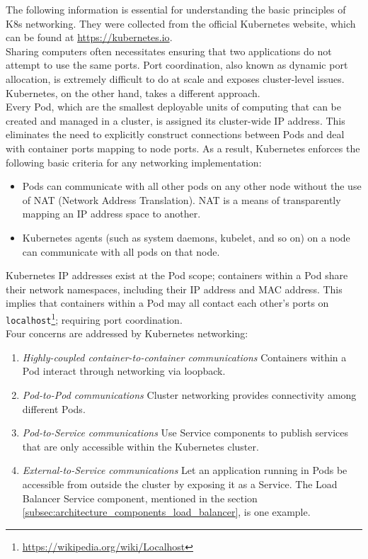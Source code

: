 The following information is essential for understanding the basic principles of
K8s networking. They were collected from the official Kubernetes website, which
can be found at \url{https://kubernetes.io}. \\ %
Sharing computers often necessitates ensuring that two applications do not
attempt to use the same ports. Port coordination, also known as dynamic port
allocation, is extremely difficult to do at scale and exposes cluster-level issues.
Kubernetes, on the other hand, takes a different approach. \\ %
Every Pod, which are the smallest deployable units of computing that can be created
and managed in a cluster\cite{k8s_pod}, is assigned its cluster-wide IP address.
This eliminates the need to explicitly construct connections between Pods and
deal with container ports mapping to node ports. As a result, Kubernetes
enforces the following basic criteria for any networking implementation:
\begin{itemize}
  \item Pods can communicate with all other pods on any other node without the use
    of NAT (Network Address Translation). NAT is a means of transparently
    mapping an IP address space to another\cite{nat}.

  \item Kubernetes agents (such as system daemons, kubelet, and so on) on a node
    can communicate with all pods on that node.
\end{itemize}
Kubernetes IP addresses exist at the Pod scope; containers within a Pod share
their network namespaces, including their IP address and MAC address. This
implies that containers within a Pod may all contact each other's ports on
\texttt{localhost}\footnote{\url{https://wikipedia.org/wiki/Localhost}};
requiring port coordination. \\ %
Four concerns are addressed by Kubernetes networking:
\begin{enumerate}
  \item \textit{Highly-coupled container-to-container communications}
    \newline
    Containers within a Pod interact through networking via loopback.

  \item \textit{Pod-to-Pod communications}
    \newline
    Cluster networking provides connectivity among different Pods.

  \item \textit{Pod-to-Service communications}
    \newline
    Use Service components to publish services that are only accessible within
    the Kubernetes cluster.

  \item \textit{External-to-Service communications}
    \newline
    Let an application running in Pods be accessible from outside the cluster by
    exposing it as a Service. The Load Balancer Service component, mentioned in
    the section \ref{subsec:architecture_components_load_balancer}, is one example.
\end{enumerate}
